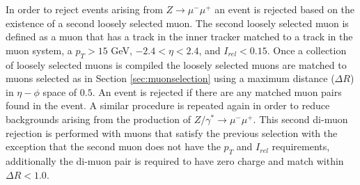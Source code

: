 In order to reject events arising from $Z \rightarrow \mu^{-}\mu^{+}$ an event is rejected based on the existence of a second loosely selected muon.
The second loosely selected muon is defined as a muon that has a track in the inner tracker matched to a track in the muon system, a  $p_{T} > 15$ GeV, $-2.4 < \eta < 2.4$, and $I_{rel} < 0.15$.
Once a collection of loosely selected muons is compiled the loosely selected muons are matched to muons selected as in Section \ref{sec:muonselection} using a maximum distance ($\Delta R$) in $\eta-\phi$ space of $0.5$.
An event is rejected if there are any matched muon pairs found in the event.
A similar procedure is repeated again in order to reduce backgrounds arising from the production of $Z/\gamma^{*} \rightarrow \mu^{-}\mu^{+}$.
This second di-muon rejection is performed with muons that satisfy the previous selection with the exception that the second muon does not have the $p_{T}$ and $I_{rel}$ requirements, additionally the di-muon pair is required to have zero charge and match within $\Delta R < 1.0$.
